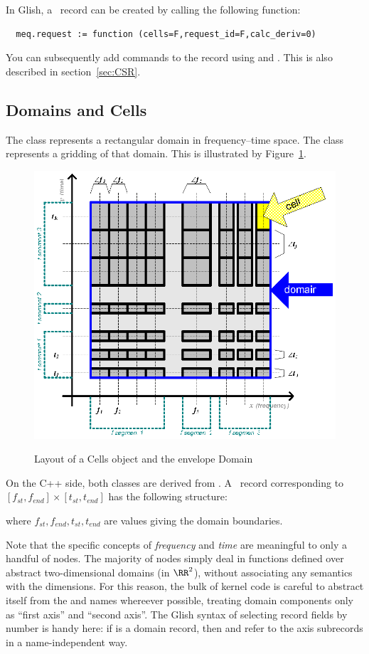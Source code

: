  In Glish, a \Request\ record can be created by calling the following
  function:

  \begin{verbatim}
  meq.request := function (cells=F,request_id=F,calc_deriv=0)
  \end{verbatim}
  
  You can subsequently add commands to the record using 
  and . This is also described in section~\ref{sec:CSR}.
  
\subsection{Domains and Cells}

  The  class represents a rectangular domain in frequency--time
  space. The  class represents a gridding of that domain. This is
  illustrated by Figure~\ref{fig:cells}.
  
  \begin{figure}
  \begin{center}
  \includegraphics[width=.5\textwidth,bb=38 554 327 811]{Figures/Cells.eps}\\
  \end{center}
  \caption{\label{fig:cells}Layout of a Cells object and the envelope Domain}
  \end{figure}
  
  On the C++ side, both classes are derived from . A \Domain\ 
  record corresponding to $[f_{st},f_{end}]\times[t_{st},t_{end}]$ has the following structure:
  
  \qq{[ freq = [ $f_{st},f_{end}$ ], time = [ $t_{st},t_{end}$ ] ]}
  
  where $f_{st},f_{end},t_{st},t_{end}$ are  values giving the domain
  boundaries.

  Note that the specific concepts of {\em frequency} and {\em time} are
  meaningful to only a handful of nodes. The majority of nodes simply deal in
  functions defined over abstract two-dimensional domains (in $\RR^2$), without
  associating any semantics with the dimensions. For this reason, the bulk of
  kernel code is careful to abstract itself from the \qq{freq} and \qq{time}
  names whereever possible, treating domain components only as ``first axis''
  and ``second axis''. The Glish syntax of selecting record fields by number is
  handy here: if \qq{dom} is a domain record, then \qq{dom[1]} and \qq{dom[2]}
  refer to the axis subrecords in a name-independent way.


